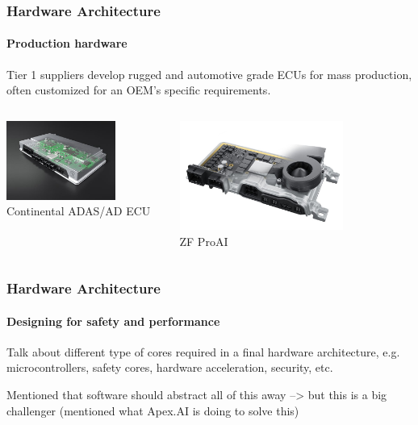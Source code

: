 \begin{frame}
\frametitle{Hardware Architecture}
\framesubtitle{Production hardware}
Tier 1 suppliers develop rugged and automotive grade ECUs for mass production,
often customized for an OEM's specific requirements.\\
\vspace{0.2cm}
\begin{columns}[]
    \begin{column}{0.5\textwidth}
        \centering
        \includegraphics[width=0.7\textwidth]{images/continental_ecu.jpg}\\
        \footnotesize Continental ADAS/AD ECU\footnotemark[1]
    \end{column}
    \begin{column}{0.5\textwidth}
        \centering
        \includegraphics[width=0.7\textwidth]{images/zf_ecu.jpg}\\
        \footnotesize ZF ProAI\footnotemark[2]
    \end{column}
\end{columns}
\end{frame}

\begin{frame}
\frametitle{Hardware Architecture}
\framesubtitle{Designing for safety and performance}
Talk about different type of cores required in a final hardware architecture,
e.g. microcontrollers, safety cores, hardware acceleration, security, etc.

Mentioned that software should abstract all of this away --> but this is a big
challenger (mentioned what Apex.AI is doing to solve this)
\end{frame}